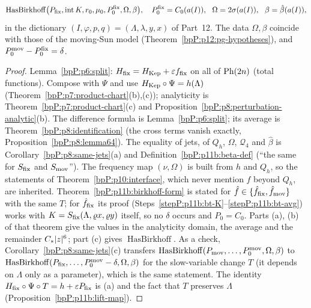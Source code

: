 \begin{proposition}
\begin{enumerate}[label=(\alph*)]
\[\operatorname{HasBirkhoff}\bigl(P_{\rm fix},\operatorname{int}K,r_0,\mu_0,P_0^{\rm fix},\Omega,\beta\bigr),\quad P_0^{\rm fix}=C_0(a(I)),\ \ \Omega=2\sigma(a(I)),\ \ \beta=\hat\beta(a(I)),\]
in the dictionary $(I,\varphi,p,q)=(\Lambda,\lambda,y,x)$ of Part~12. The data $\Omega,\beta$ coincide with those of the moving-Sun model (Theorem~\ref{bpP:p12:pg-hypotheses}), and $P_0^{\rm mov}-P_0^{\rm fix}=\delta$.
\end{enumerate}
\end{proposition}
\begin{proof}
\label{stepP:p13:fh-chart} Lemma~\ref{bpP:p6:split}: $H_{\rm fix}=H_{\rm Kep}+\varepsilon f_{\rm fix}$ on all of $\mathrm{Ph}(2n)$ (total functions). Compose with $\Psi$ and use $H_{\rm Kep}\circ\Psi=h(\Lambda)$ (Theorem~\ref{bpP:p7:product-chart}(b),(c)); analyticity is Theorem~\ref{bpP:p7:product-chart}(c) and Proposition~\ref{bpP:p8:perturbation-analytic}(b).
\label{stepP:p13:fh-id} The difference formula is Lemma~\ref{bpP:p6:split}; its average is Theorem~\ref{bpP:p8:identification} (the cross terms vanish exactly, Proposition~\ref{bpP:p8:lemma64}). The equality of jets, of $Q_h$, $\Omega$, $\mathcal Q_4$ and $\hat\beta$ is Corollary~\ref{bpP:p8:same-jets}(a) and Definition~\ref{bpP:p11b:beta-def} (``the same for $S_{\rm fix}$ and $S_{\rm mov}$''). The frequency map $(\nu,\Omega)$ is built from $h$ and $Q_h$, so the statements of Theorem~\ref{bpP:p10:interface}, which never mention $f$ beyond $Q_h$, are inherited.
\label{stepP:p13:fh-bnf} Theorem~\ref{bpP:p11b:birkhoff-form} is stated for $\hat f\in\{\hat f_{\rm fix},\hat f_{\rm mov}\}$ with the same $T$; for $\hat f_{\rm fix}$ its proof (Steps~\ref{stepP:p11b:bt-K}--\ref{stepP:p11b:bt-avg}) works with $K=S_{\rm fix}(\Lambda,\varrho x,\varrho y)$ itself, so no $\delta$ occurs and $P_0=C_0$. Parts (a), (b) of that theorem give the values in the analyticity domain, the average and the remainder $C_*\lvert z\rvert^6$; part (c) gives $\operatorname{HasBirkhoff}$. As a check, Corollary~\ref{bpP:p8:same-jets}(c) transfers $\operatorname{HasBirkhoff}(P_{\rm mov},\dots,P_0^{\rm mov},\Omega,\beta)$ to $\operatorname{HasBirkhoff}(P_{\rm fix},\dots,P_0^{\rm mov}-\delta,\Omega,\beta)$ for the slow-variable change $T$ (it depends on $\Lambda$ only as a parameter), which is the same statement. The identity $H_{\rm fix}\circ\Psi\circ T=h+\varepsilon P_{\rm fix}$ is (a) and the fact that $T$ preserves $\Lambda$ (Proposition~\ref{bpP:p11b:lift-map}).
\end{proof}

